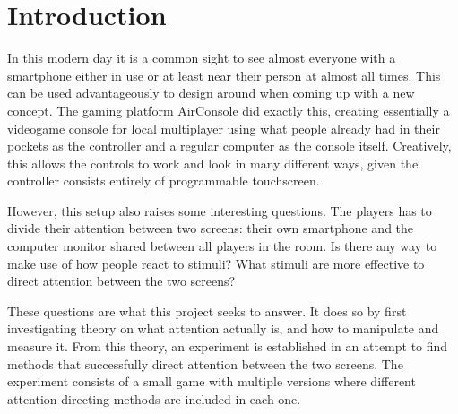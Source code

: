 \chapter{Introduction}\label{ch:intro}
In this modern day it is a common sight to see almost everyone with a smartphone either in use or at least near their person at almost all times. This can be used advantageously to design around when coming up with a new concept. The gaming platform AirConsole did exactly this, creating essentially a videogame console for local multiplayer using what people already had in their pockets as the controller and a regular computer as the console itself. Creatively, this allows the controls to work and look in many different ways, given the controller consists entirely of programmable touchscreen.

However, this setup also raises some interesting questions. The players has to divide their attention between two screens: their own smartphone and the computer monitor shared between all players in the room. Is there any way to make use of how people react to stimuli? What stimuli are more effective to direct attention between the two screens?

These questions are what this project seeks to answer. It does so by first investigating theory on what attention actually is, and how to manipulate and measure it. From this theory, an experiment is established in an attempt to find methods that successfully direct attention between the two screens. The experiment consists of a small game with multiple versions where different attention directing methods are included in each one.